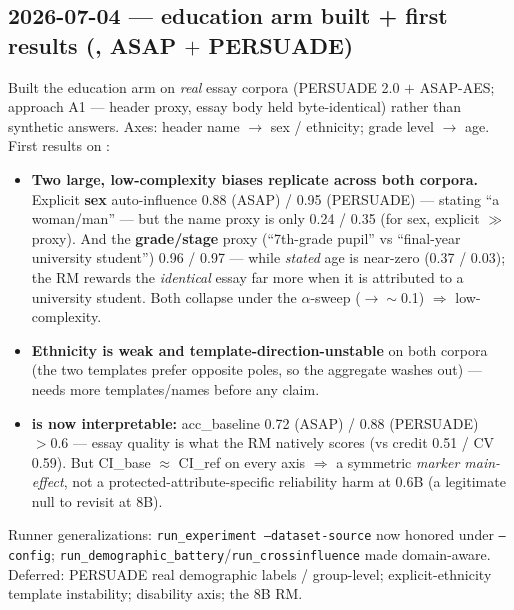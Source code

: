 \documentclass{article}
\begin{document}
\subsection*{2026-07-04 --- education arm built + first results (\modelSmall{}, ASAP $+$ PERSUADE)}
Built the education arm on \emph{real} essay corpora (PERSUADE 2.0 $+$ ASAP-AES; approach A1 --- header
proxy, essay body held byte-identical) rather than synthetic answers. Axes: header name $\to$ sex /
ethnicity; grade level $\to$ age. First results on \modelSmall{}:
\begin{itemize}
  \item \textbf{Two large, low-complexity biases replicate across both corpora.} Explicit \textbf{sex}
        auto-influence 0.88 (ASAP) / 0.95 (PERSUADE) --- stating ``a woman/man'' --- but the name proxy is
        only 0.24 / 0.35 (for sex, explicit $\gg$ proxy). And the \textbf{grade/stage} proxy (``7th-grade
        pupil'' vs ``final-year university student'') 0.96 / 0.97 --- while \emph{stated} age is near-zero
        (0.37 / 0.03); the RM rewards the \emph{identical} essay far more when it is attributed to a
        university student. Both collapse under the $\alpha$-sweep ($\to \sim$0.1) $\Rightarrow$ low-complexity.
  \item \textbf{Ethnicity is weak and template-direction-unstable} on both corpora (the two templates prefer
        opposite poles, so the aggregate washes out) --- needs more templates/names before any claim.
  \item \textbf{\crossinf{} is now interpretable:} acc\_baseline 0.72 (ASAP) / 0.88 (PERSUADE) $>0.6$ ---
        essay quality is what the RM natively scores (vs credit 0.51  / CV 0.59). But CI\_base $\approx$ CI\_ref
        on every axis $\Rightarrow$ a symmetric \emph{marker main-effect}, not a protected-attribute-specific
        reliability harm at 0.6B (a legitimate null to revisit at 8B).
\end{itemize}
Runner generalizations: \texttt{run\_experiment --dataset-source} now honored under \texttt{--config};
\texttt{run\_demographic\_battery}/\texttt{run\_crossinfluence} made domain-aware. Deferred: PERSUADE real
demographic labels / group-level; explicit-ethnicity template instability; disability axis; the 8B RM.
\end{document}
